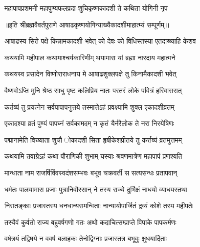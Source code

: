 \twolineshloka
{महापापप्रशमनी महापुण्यफलप्रदा}
{शुचिकृष्णकादशी ते कथिता योगिनी नृप} %

॥इति श्रीब्रह्मवैवर्तपुराणे आषाढकृष्णयोगिन्याख्यैकादशीमाहात्म्यं सम्पूर्णम्॥


\hyperref[sec:ekadashi_mahatmyam_vrata_raja]{\closesub}
\clearpage

\label{sec:vrata-raja-ashadha-shukla-shayani}


\twolineshloka
{आषाढस्य सिते पक्षे किन्नामकादशी भवेत्}
{को देवः को विधिस्तस्या एतदाख्याहि केशव} %


\twolineshloka
{कथयामि महीपाल कथामाश्चर्यकारिणीम्}
{थयामास यां ब्रह्मा नारदाय महात्मने} %


\twolineshloka
{कथयस्व प्रसादेन विष्णोराराधनाय मे}
{आषाढशुक्लपक्षे तु किनामैकादशी भवेत्} %


\twolineshloka
{वैष्णवोऽप्ति मुनि श्रेष्ठ साधु पृष्ट कलिप्रिय}
{नातः परतरं लोके पवित्रं हरिवासरात्} %

\twolineshloka
{कर्तव्यं तु प्रयत्नेन सर्वपापापनुत्तये}
{तस्मात्तेऽहं प्रवक्ष्यामि शुक्ल एकादशीव्रतम्} %

\twolineshloka
{एकादश्या व्रतं पुण्यं पापघ्नं सर्वकामदम्}
{न कृतं यैर्नरैलोक ते नरा निरयेषिणः} %

\twolineshloka
{पद्मानामेति विख्याता शुचौ ोकादशी सिता}
{हृषीकेशप्रीतये तु कर्त्तव्यं व्रतमुत्तमम्} %

\twolineshloka
{कथयामि तवाग्रेऽहं कथा पौराणिकी शुभाम्}
{यस्याः श्रवणमात्रेण महापापं प्रणश्यति} %

\twolineshloka
{मान्धाता नाम राजर्षिर्विवस्वदंशसम्भवः}
{बभूव चक्रवर्ती स सत्यसन्धः प्रतापवान्} %

\twolineshloka
{धर्मतः पालयामास प्रजाः पुत्रानिवौरसान्}
{ने तस्य राज्ये दुर्भिक्षं नाधयो व्याधयस्तथा} %

\twolineshloka
{निरातङ्काः प्रजास्तस्य धनधान्यसमन्विताः}
{नान्यायोपार्जितं द्रव्यं कोशे तस्य महीपतेः} %

\twolineshloka
{तस्यैवं कुर्वतो राज्य बहुवर्षगणो गतः}
{अथो कदाचित्सम्प्राप्ते विपाके पापकर्मणः} %

\twolineshloka
{वर्षत्रयं तद्विषये न ववर्ष बलाहकः}
{तेनोद्विग्नाः प्रजास्तत्र बभूवुः क्षुधयार्दिताः} %

